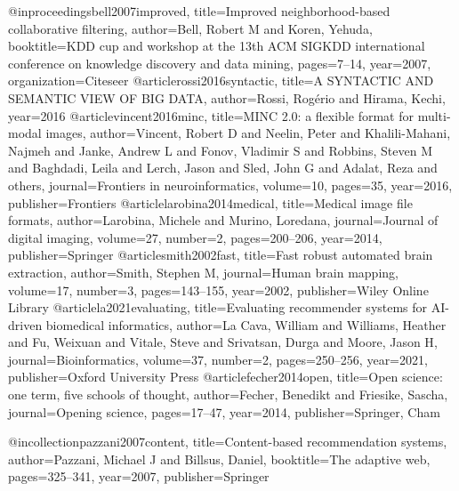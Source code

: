@inproceedings{bell2007improved,
  title={Improved neighborhood-based collaborative filtering},
  author={Bell, Robert M and Koren, Yehuda},
  booktitle={KDD cup and workshop at the 13th ACM SIGKDD international conference on knowledge discovery and data mining},
  pages={7--14},
  year={2007},
  organization={Citeseer}
}
@article{rossi2016syntactic,
  title={A SYNTACTIC AND SEMANTIC VIEW OF BIG DATA},
  author={Rossi, Rog{\'e}rio and Hirama, Kechi},
  year={2016}
}
@article{vincent2016minc,
  title={MINC 2.0: a flexible format for multi-modal images},
  author={Vincent, Robert D and Neelin, Peter and Khalili-Mahani, Najmeh and Janke, Andrew L and Fonov, Vladimir S and Robbins, Steven M and Baghdadi, Leila and Lerch, Jason and Sled, John G and Adalat, Reza and others},
  journal={Frontiers in neuroinformatics},
  volume={10},
  pages={35},
  year={2016},
  publisher={Frontiers}
}
@article{larobina2014medical,
  title={Medical image file formats},
  author={Larobina, Michele and Murino, Loredana},
  journal={Journal of digital imaging},
  volume={27},
  number={2},
  pages={200--206},
  year={2014},
  publisher={Springer}
}
@article{smith2002fast,
  title={Fast robust automated brain extraction},
  author={Smith, Stephen M},
  journal={Human brain mapping},
  volume={17},
  number={3},
  pages={143--155},
  year={2002},
  publisher={Wiley Online Library}
}
@article{la2021evaluating,
  title={Evaluating recommender systems for {AI}-driven biomedical informatics},
  author={La Cava, William and Williams, Heather and Fu, Weixuan and Vitale, Steve and Srivatsan, Durga and Moore, Jason H},
  journal={Bioinformatics},
  volume={37},
  number={2},
  pages={250--256},
  year={2021},
  publisher={Oxford University Press}
}
@article{fecher2014open,
  title={Open science: one term, five schools of thought},
  author={Fecher, Benedikt and Friesike, Sascha},
  journal={Opening science},
  pages={17--47},
  year={2014},
  publisher={Springer, Cham}
}

@incollection{pazzani2007content,
  title={Content-based recommendation systems},
  author={Pazzani, Michael J and Billsus, Daniel},
  booktitle={The adaptive web},
  pages={325--341},
  year={2007},
  publisher={Springer}
}

